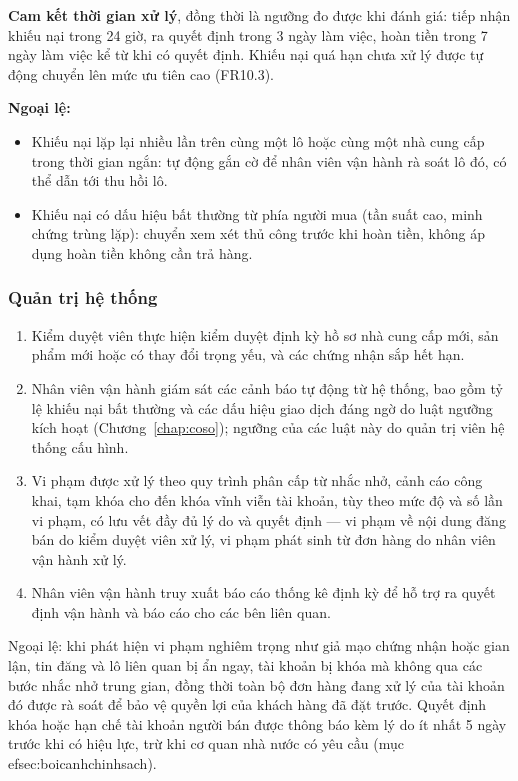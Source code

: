 \noindent\textbf{Cam kết thời gian xử lý}, đồng thời là ngưỡng đo được khi đánh giá: tiếp nhận khiếu nại trong 24 giờ, ra quyết định trong 3 ngày làm việc, hoàn tiền trong 7 ngày làm việc kể từ khi có quyết định. Khiếu nại quá hạn chưa xử lý được tự động chuyển lên mức ưu tiên cao (FR10.3).

\noindent\textbf{Ngoại lệ:}
\begin{itemize}
    \item Khiếu nại lặp lại nhiều lần trên cùng một lô hoặc cùng một nhà cung cấp trong thời gian ngắn: tự động gắn cờ để nhân viên vận hành rà soát lô đó, có thể dẫn tới thu hồi lô.
    \item Khiếu nại có dấu hiệu bất thường từ phía người mua (tần suất cao, minh chứng trùng lặp): chuyển xem xét thủ công trước khi hoàn tiền, không áp dụng hoàn tiền không cần trả hàng.
\end{itemize}

\subsubsection*{Quản trị hệ thống}
\begin{enumerate}
    \item Kiểm duyệt viên thực hiện kiểm duyệt định kỳ hồ sơ nhà cung cấp mới, sản phẩm mới hoặc có thay đổi trọng yếu, và các chứng nhận sắp hết hạn.
    \item Nhân viên vận hành giám sát các cảnh báo tự động từ hệ thống, bao gồm tỷ lệ khiếu nại bất thường và các dấu hiệu giao dịch đáng ngờ do luật ngưỡng kích hoạt (Chương~\ref{chap:coso}); ngưỡng của các luật này do quản trị viên hệ thống cấu hình.
    \item Vi phạm được xử lý theo quy trình phân cấp từ nhắc nhở, cảnh cáo công khai, tạm khóa cho đến khóa vĩnh viễn tài khoản, tùy theo mức độ và số lần vi phạm, có lưu vết đầy đủ lý do và quyết định --- vi phạm về nội dung đăng bán do kiểm duyệt viên xử lý, vi phạm phát sinh từ đơn hàng do nhân viên vận hành xử lý.
    \item Nhân viên vận hành truy xuất báo cáo thống kê định kỳ để hỗ trợ ra quyết định vận hành và báo cáo cho các bên liên quan.
\end{enumerate}

Ngoại lệ: khi phát hiện vi phạm nghiêm trọng như giả mạo chứng nhận hoặc gian lận, tin đăng và lô liên quan bị ẩn ngay, tài khoản bị khóa mà không qua các bước nhắc nhở trung gian, đồng thời toàn bộ đơn hàng đang xử lý của tài khoản đó được rà soát để bảo vệ quyền lợi của khách hàng đã đặt trước. Quyết định khóa hoặc hạn chế tài khoản người bán được thông báo kèm lý do ít nhất 5 ngày trước khi có hiệu lực, trừ khi cơ quan nhà nước có yêu cầu (mục~
ef{sec:boicanhchinhsach}).


